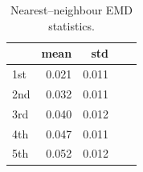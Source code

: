 \begin{table}
\caption{Nearest–neighbour EMD statistics.}
\label{tab:emd-nn}
\begin{tabular}{lrrrr}
\toprule
 & mean & std \\
\midrule
1st & 0.021 & 0.011 \\
2nd & 0.032 & 0.011 \\
3rd & 0.040 & 0.012 \\
4th & 0.047 & 0.011 \\
5th & 0.052 & 0.012 \\
\bottomrule
\end{tabular}
\end{table}
